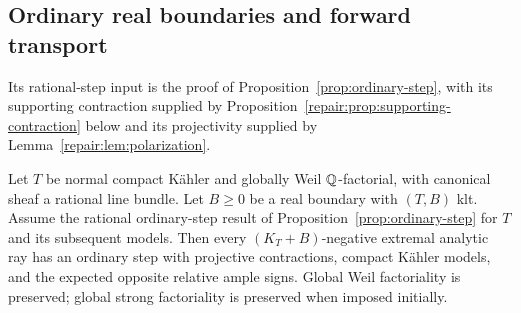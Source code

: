 \subsection{Ordinary real boundaries and forward transport}\label{repair:sec:real}

Its rational-step input is the proof of Proposition~\ref{prop:ordinary-step},
with its supporting contraction supplied by
Proposition~\ref{repair:prop:supporting-contraction} below and its projectivity
supplied by Lemma~\ref{repair:lem:polarization}.

\begin{proposition}\label{repair:prop:real}
Let $T$ be normal compact K\"ahler and globally Weil $\mathbb Q$-factorial,
with canonical sheaf a rational line bundle. Let $B\geq0$ be a real
boundary with $(T,B)$ klt. Assume the rational ordinary-step result
of Proposition~\ref{prop:ordinary-step} for $T$ and its subsequent models. Then every
$(K_T+B)$-negative extremal analytic ray has an ordinary step with
projective contractions, compact K\"ahler models, and the expected
opposite relative ample signs. Global Weil factoriality is preserved;
global strong factoriality is preserved when imposed initially.
\end{proposition}
